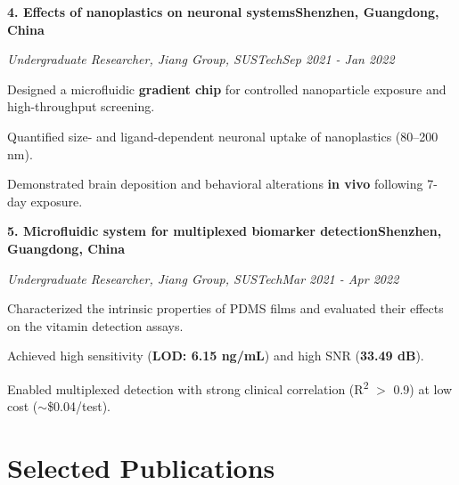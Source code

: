 \documentclass[a4paper,10pt]{article}
\newcommand{\rowbb}[2]{\noindent\textbf{#1}\hfill\textbf{#2}\par}   %
\newcommand{\rowii}[2]{\noindent\textit{#1}\hfill\textit{#2}\par}   %
\begin{document}
\rowbb{4. Effects of nanoplastics on neuronal systems}{Shenzhen, Guangdong, China}
\rowii{Undergraduate Researcher, Jiang Group, SUSTech}{Sep 2021 - Jan 2022}
\begin{points}
  \item Designed a microfluidic \textbf{gradient chip} for controlled nanoparticle
        exposure and high-throughput screening.
  \item Quantified size- and ligand-dependent neuronal uptake of nanoplastics
        (80--200 nm).
  \item Demonstrated brain deposition and behavioral alterations \textbf{in vivo}
        following 7-day exposure.
\end{points}
\vspace{2.5pt}

\rowbb{5. Microfluidic system for multiplexed biomarker detection}{Shenzhen, Guangdong, China}
\rowii{Undergraduate Researcher, Jiang Group, SUSTech}{Mar 2021 - Apr 2022}
\begin{points}
  \item Characterized the intrinsic properties of PDMS films and evaluated their
        effects on the vitamin detection assays.
  \item Achieved high sensitivity (\textbf{LOD: 6.15 ng/mL}) and high SNR
        (\textbf{33.49 dB}).
  \item Enabled multiplexed detection with strong clinical correlation
        (R\textsuperscript{2} $>$ 0.9) at low cost ($\sim$\$0.04/test).
\end{points}

\section*{Selected Publications}
\end{document}
